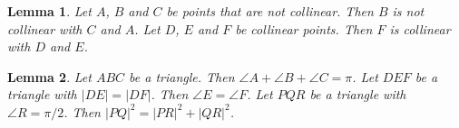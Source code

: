 \documentclass{article}
\newtheorem{lemma}{Lemma}
\begin{document}
\begin{lemma}\label{collinear}
Let $A$, $B$ and $C$ be points that are not collinear. Then $B$ is not collinear with $C$ and $A$. Let $D$, $E$ and $F$ be collinear points. Then $F$ is collinear with $D$ and $E$.
\end{lemma}

\begin{lemma}\label{triangles}
Let $ABC$ be a triangle. Then $\angle A+\angle B+\angle C=\pi$. Let $DEF$ be a triangle with $|DE|=|DF|$. Then $\angle E=\angle F$. Let $PQR$ be a triangle with $\angle R=\pi/2$. Then $|PQ|^2=|PR|^2+|QR|^2$.
\end{lemma}
\end{document}
